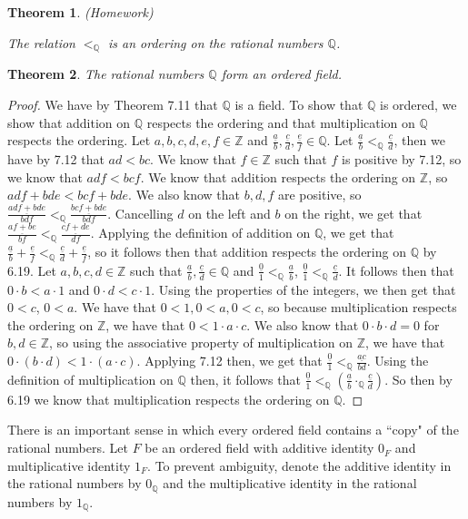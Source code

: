 \documentclass[12pt]{article}
\newcommand{\bbQ}{\mathbb{Q}}
\newcommand{\bbZ}{\mathbb{Z}}
\newcommand{\fr}[2]{\frac{\underline{#1}}{#2}}
\renewcommand{\_}[1]{\underline{ #1 }}
\newtheorem{theorem}{Theorem}[section]
\theoremstyle{definition}
\numberwithin{equation}{subsection}
\begin{document}
\begin{theorem} { (Homework)}

The relation $<_\bbQ$ is an ordering on the rational numbers $\bbQ$.
\end{theorem}

\begin{theorem}
The rational numbers $\bbQ$ form an ordered field.
\end{theorem}

\begin{proof}
We have by Theorem 7.11 that $\bbQ$ is a field. To show that $\bbQ$ is ordered, we show that addition on $\bbQ$ respects the ordering and that multiplication on $\bbQ$ respects the ordering. \newline
Let $a,b,c,d,e,f \in \bbZ$ and $\fr{a}{b}, \fr{c}{d}, \fr{e}{f} \in \bbQ$. Let $\fr{a}{b} <_{\bbQ} \fr{c}{d}$, then we have by 7.12 that $ad < bc$. We know that $f \in \bbZ$ such that $f$ is positive by 7.12, so we know that $adf < bcf$. We know that addition respects the ordering on $\bbZ$, so $adf + bde < bcf + bde$. We also know that $b,d,f$ are positive, so $\fr{adf + bde}{bdf} <_{\bbQ} \fr{bcf + bde}{bdf}$. Cancelling $d$ on the left and $b$ on the right, we get that $\fr{af + be}{bf} <_{\bbQ} \fr{cf + de}{df}$. Applying the definition of addition on $\bbQ$, we get that $\fr{a}{b} + \fr{e}{f} <_{\bbQ} \fr{c}{d} + \fr{e}{f}$, so it follows then that addition respects the ordering on $\bbQ$ by 6.19. \newline
Let $a,b,c,d \in \bbZ$ such that $\fr{a}{b}, \fr{c}{d} \in \bbQ$ and $\fr{0}{1} <_{\bbQ} \fr{a}{b}$, $\fr{0}{1} <_{\bbQ} \fr{c}{d}$. It follows then that $0 \cdot b < a \cdot 1$ and $0 \cdot d < c \cdot 1$. Using the properties of the integers, we then get that $0 < c$, $0 < a$. We have that $0 < 1, 0 < a, 0 < c$, so because multiplication respects the ordering on $\bbZ$, we have that $0 < 1 \cdot a \cdot c$. We also know that $0 \cdot b \cdot d = 0$ for $b,d \in \bbZ$, so using the associative property of multiplication on $\bbZ$, we have that $0 \cdot (b \cdot d) < 1 \cdot (a \cdot c)$. Applying 7.12 then, we get that $\fr{0}{1} <_{\bbQ} \fr{ac}{bd}$. Using the definition of multiplication on $\bbQ$ then, it follows that $\fr{0}{1} <_{\bbQ} (\fr{a}{b} \cdot_{\bbQ} \fr{c}{d})$. So then by 6.19 we know that multiplication respects the ordering on $\bbQ$.
\end{proof}

There is an important sense in which every ordered field contains a ``copy" of the rational 
numbers.  Let $F$ be an ordered field with additive identity $0_F$ and multiplicative identity
$1_F$.  To prevent ambiguity, denote the additive identity in the rational numbers by $0_\bbQ$
and the multiplicative identity in the rational numbers by $1_\bbQ$.
\end{document}
